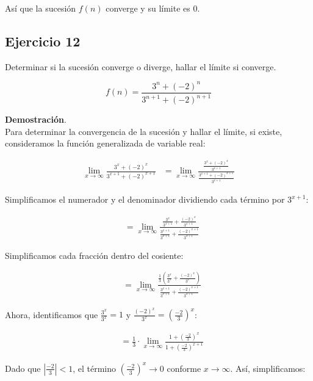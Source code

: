 \documentclass{article}
\begin{document}
    Así que la sucesión $f(n)$ converge y su límite es 0.

    \subsection*{Ejercicio 12}

    Determinar si la sucesión converge o diverge, hallar el límite si converge.

    $$
    f(n)=\frac{3^{n}+(-2)^{n}}{3^{n+1}+(-2)^{n+1}}
    $$

    \textbf{Demostración}.\\

    Para determinar la convergencia de la sucesión y hallar el límite, si existe, consideramos la función generalizada de variable real:

    \begin{align*}
    \lim _{x \rightarrow \infty} \frac{3^{x}+(-2)^{x}}{3^{x+1}+(-2)^{x+1}}
    & =\lim _{x \rightarrow \infty} \frac{\frac{3^{x}+(-2)^{x}}{3^{x+1}}}{\frac{3^{x+1}+(-2)^{x+1}}{3^{x+1}}}
    \end{align*}

    Simplificamos el numerador y el denominador dividiendo cada término por \(3^{x+1}\):

    \begin{align*}
    & =\lim _{x \rightarrow \infty} \frac{\frac{3^{x}}{3^{x+1}}+\frac{(-2)^{x}}{3^{x+1}}}{\frac{3^{x+1}}{3^{x+1}}+\frac{(-2)^{x+1}}{3^{x+1}}}
    \end{align*}

    Simplificamos cada fracción dentro del cosiente:

    \begin{align*}
    & =\lim _{x \rightarrow \infty} \frac{\frac{1}{3}\left(\frac{3^{x}}{3^{x}}+\frac{(-2)^{x}}{3^{x}}\right)}{\frac{3^{x+1}}{3^{x+1}}+\frac{(-2)^{x+1}}{3^{x+1}}}
    \end{align*}

    Ahora, identificamos que \(\frac{3^{x}}{3^{x}} = 1\) y \(\frac{(-2)^{x}}{3^{x}} = \left(\frac{-2}{3}\right)^x\):

    \begin{align*}
    & =\frac{1}{3} \cdot \lim _{x \rightarrow \infty} \frac{1+\left(\frac{-2}{3}\right)^{x}}{1+\left(\frac{-2}{3}\right)^{x+1}}
    \end{align*}

    Dado que \(\left|\frac{-2}{3}\right| < 1\), el término \(\left( \frac{-2}{3} \right)^x \to 0\) conforme \(x \to \infty\). Así, simplificamos:
\end{document}

